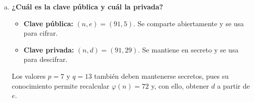 \begin{enumerate}[a)]
	      Reduciendo:
	      \begin{align*}
		      29 \times 22 & = 638 = 7 \times 91 + 1 \equiv 1 \pmod{91},     \\
		      1 \times 29  & = 29 \pmod{91},                                 \\
		      29 \times 76 & = 2204 = 24 \times 91 + 20 \equiv 20 \pmod{91}.
	      \end{align*}

	      \[
		      \boxed{76^{29} \bmod 91 = 20 = M. \quad \checkmark}
	      \]

	      El descifrado recupera el mensaje original $M = 20$, como garantiza el teorema de Euler: $M^{ed} \equiv M \pmod{n}$ cuando $ed \equiv 1 \pmod{\varphi(n)}$.

	\item {\bfseries ¿Cuál es la clave pública y cuál la privada?}

	      \begin{itemize}
		      \item \textbf{Clave pública:} $(n, e) = (91, 5)$. Se comparte abiertamente y se usa para cifrar.
		      \item \textbf{Clave privada:} $(n, d) = (91, 29)$. Se mantiene en secreto y se usa para descifrar.
	      \end{itemize}

	      Los valores $p = 7$ y $q = 13$ también deben mantenerse secretos, pues su conocimiento permite recalcular $\varphi(n) = 72$ y, con ello, obtener $d$ a partir de $e$.

\end{enumerate}

\vspace{1cm }

